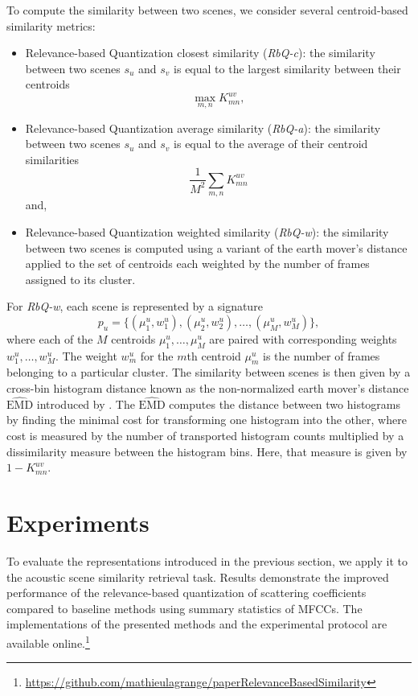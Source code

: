 \documentclass[smallextended]{svjour3}
\newcommand*{\EMD}{\mathrm{EMD}}
\begin{document}
To compute the similarity between two scenes, we consider several centroid-based similarity metrics:
\begin{itemize}
\item Relevance-based Quantization closest similarity (\emph{RbQ-c}): the similarity between two scenes $s_u$ and $s_v$ is equal to the largest similarity between their centroids
\begin{equation}
	\max_{m,n} K_{mn}^{uv},
\end{equation}
\item Relevance-based Quantization average similarity  (\emph{RbQ-a}): the similarity between two scenes $s_u$ and $s_v$ is equal to the average of their centroid similarities
\begin{equation}
	\frac{1}{M^2} \sum_{m,n} K_{mn}^{uv}
\end{equation}
and,
\item Relevance-based Quantization weighted similarity  (\emph{RbQ-w}): the similarity between two scenes is computed using a variant of the earth mover's distance applied to the set of centroids each weighted by the number of frames assigned to its cluster.
\end{itemize}

For \emph{RbQ-w}, each scene is represented by a signature
$$
p_u = \lbrace(\mu_1^u,w_1^u),(\mu_2^u,w_2^u),\ldots,(\mu_M^u,w_M^u)\rbrace,
$$
where each of the $M$ centroids $\mu_1^u, \ldots, \mu_M^u$ are paired with corresponding weights $w_1^u, \ldots, w_M^u$. The weight $w_m^u$ for the $m$th centroid $\mu_m^u$ is the number of frames belonging to a particular cluster. The similarity between scenes is then given by a cross-bin histogram distance known as the non-normalized earth mover's distance $\widehat{\EMD}$ introduced by \cite{pele2008linear}. The $\widehat{\EMD}$ computes the distance between two histograms by finding the minimal cost for transforming one histogram into the other, where cost is measured by the number of transported histogram counts multiplied by a dissimilarity measure between the histogram bins. Here, that measure is given by $1-K_{mn}^{uv}$.

\section{Experiments}
\label{sec:experiments}

To evaluate the representations introduced in the previous section, we apply it to the acoustic scene similarity retrieval task.
Results demonstrate the improved performance of the relevance-based quantization of scattering coefficients compared to baseline methods using summary statistics of MFCCs.
The implementations of the presented methods and the experimental protocol are available online.\footnote{\url{https://github.com/mathieulagrange/paperRelevanceBasedSimilarity}}
\end{document}

